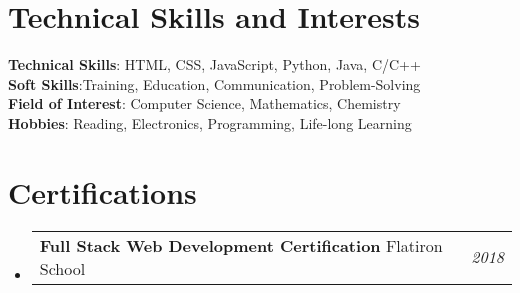 \documentclass[a4paper,12pt]{article}
\makeatletter
\newcommand{\resumePOR}[3]{
\vspace{0.5mm}\item
    \begin{tabular*}{0.97\textwidth}[t]{l@{\extracolsep{\fill}}r}
        \textbf{#1}\hspace{0.3mm}#2 & \textit{\small{#3}} 
    \end{tabular*}
    \vspace{-2mm}
}
\newcommand{\resumeSubHeadingListStart}{\begin{itemize}[leftmargin=*,labelsep=0mm]}
\newcommand{\resumeSubHeadingListEnd}{\end{itemize}\vspace{2mm}}
\makeatother
\begin{document}
\section{\textbf{Technical Skills and Interests}}
 \begin{itemize}[leftmargin=0.1in, label={}]
    \small{\item{
     \textbf{Technical Skills}{: HTML, CSS, JavaScript, Python, Java, C/C++} \\
     \textbf{Soft Skills}{:Training, Education, Communication, Problem-Solving } \\
     \textbf{Field of Interest}{: Computer Science, Mathematics, Chemistry } \\
     \textbf{Hobbies}{: Reading, Electronics, Programming, Life-long Learning } \\
    }}
 \end{itemize}
 \vspace{-16pt}



    




\section{\textbf{Certifications}}
\vspace{-0.4mm}
\resumeSubHeadingListStart
\resumePOR{Full Stack Web Development Certification } %
    {Flatiron School } %
    {2018} %
    


\resumeSubHeadingListEnd
\vspace{-5mm}



\end{document}
